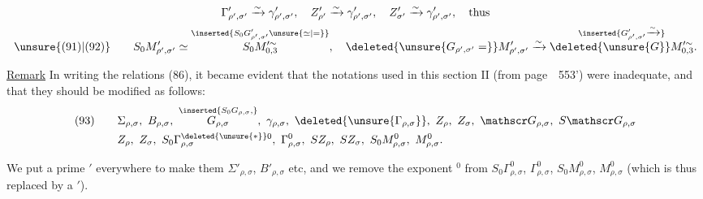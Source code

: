 \[
\begin{gathered}
\Gamma_{\rho',\sigma'}^{\prime}\xrightarrow{\sim}\gamma_{\rho',\sigma'}^{\prime},\quad
Z_{\rho'}^{\prime}\xrightarrow{\sim}\gamma_{\rho',\sigma'}^{\prime},\quad
Z_{\sigma'}^{\prime}\xrightarrow{\sim}\gamma_{\rho',\sigma'}^{\prime},\quad\text{thus}\\
\unsure{(91)|(92)}\qquad
S_0M_{\rho',\sigma'}^{\prime}\simeq
\overset{\inserted{S_0G_{\rho',\sigma'}^{\prime}\unsure{\simeq|=}}}{S_0M_{0,3}^{\prime\sim}},\quad
\deleted{\unsure{G_{\rho',\sigma'}=}}M_{\rho',\sigma'}^{\prime}\xrightarrow{\sim}
\overset{\inserted{G_{\rho',\sigma'}^{\prime}\xrightarrow{\sim}}}{\deleted{\unsure{G}}M_{0,3}^{\prime\sim}}.
\end{gathered}
\]

\uline{Remark} In writing the relations (86), it became evident that the notations used in this section II (from page\ \ 553') were inadequate, and that they should be modified as follows:
\[
\begin{aligned}
(93)\qquad&\Sigma_{\rho,\sigma},\ B_{\rho,\sigma},\
\overset{\inserted{S_0G_{\rho,\sigma},}}{G_{\rho,\sigma}},\
\gamma_{\rho,\sigma},\ \deleted{\unsure{\Gamma_{\rho,\sigma}}},\
Z_\rho,\ Z_\sigma,\ \mathscr G_{\rho,\sigma},\ S\mathscr G_{\rho,\sigma}\\
&Z_\rho,\ Z_\sigma,\ S_0\Gamma_{\rho,\sigma}^{\deleted{\unsure{*}}0},\
\Gamma_{\rho,\sigma}^0,\ SZ_\rho,\ SZ_\sigma,\ S_0M_{\rho,\sigma}^0,\ M_{\rho,\sigma}^0.
\end{aligned}
\]

We put a prime $'$ everywhere to make them $\Sigma'_{\rho,\sigma}$, $B'_{\rho,\sigma}$ etc, and we remove the exponent $^0$ from $S_0\Gamma_{\rho,\sigma}^0$, $\Gamma_{\rho,\sigma}^0$, $S_0M_{\rho,\sigma}^0$, $M_{\rho,\sigma}^0$ (which is thus replaced by a $'$).

